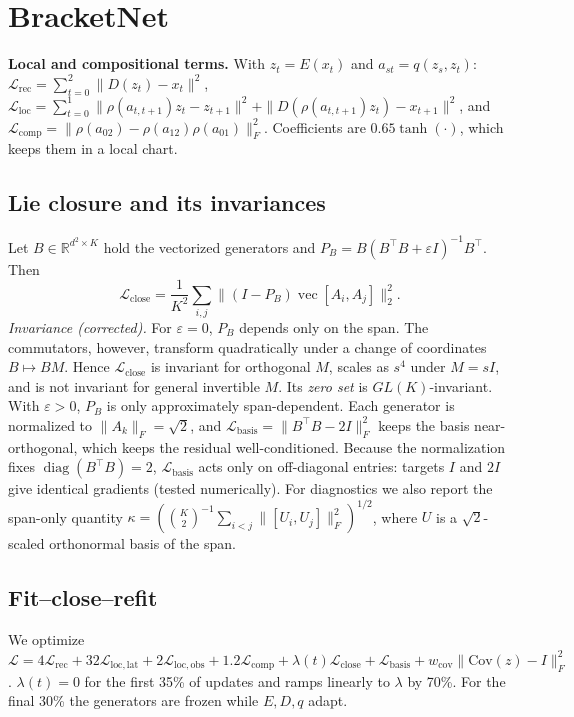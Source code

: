 \documentclass[10pt]{article}
\newcommand{\Lclose}{\mathcal{L}_{\mathrm{close}}}
\begin{document}
\section{BracketNet}
\textbf{Local and compositional terms.} With $z_t=E(x_t)$ and $a_{st}=q(z_s,z_t)$:
$\mathcal L_{\mathrm{rec}}=\sum_{t=0}^2\|D(z_t)-x_t\|^2$,
$\mathcal L_{\mathrm{loc}}=\sum_{t=0}^1\|\rho(a_{t,t+1})z_t-z_{t+1}\|^2+\|D(\rho(a_{t,t+1})z_t)-x_{t+1}\|^2$,
and $\mathcal L_{\mathrm{comp}}=\|\rho(a_{02})-\rho(a_{12})\rho(a_{01})\|_F^2$. Coefficients are
$0.65\tanh(\cdot)$, which keeps them in a local chart.

\subsection{Lie closure and its invariances}\label{sec:closure}
Let $B\in\mathbb R^{d^2\times K}$ hold the vectorized generators and $P_B=B(B^\top B+\varepsilon I)^{-1}B^\top$. Then
\begin{equation}\label{eq:lclose}
\Lclose=\frac1{K^2}\sum_{i,j}\|(I-P_B)\operatorname{vec}[A_i,A_j]\|_2^2 .
\end{equation}
\emph{Invariance (corrected).} For $\varepsilon=0$, $P_B$ depends only on the span. The commutators, however,
transform quadratically under a change of coordinates $B\mapsto BM$. Hence $\Lclose$ is invariant for orthogonal
$M$, scales as $s^4$ under $M=sI$, and is not invariant for general invertible $M$. Its \emph{zero set} is
$GL(K)$-invariant. With $\varepsilon>0$, $P_B$ is only approximately span-dependent. Each generator is normalized
to $\|A_k\|_F=\sqrt2$, and $\mathcal L_{\mathrm{basis}}=\|B^\top B-2I\|_F^2$ keeps the basis near-orthogonal, which
keeps the residual well-conditioned. Because the normalization fixes $\operatorname{diag}(B^\top B)=2$,
$\mathcal L_{\mathrm{basis}}$ acts only on off-diagonal entries: targets $I$ and $2I$ give identical gradients
(tested numerically). For diagnostics we also report the span-only quantity
$\kappa=(\binom K2^{-1}\sum_{i<j}\|[U_i,U_j]\|_F^2)^{1/2}$, where $U$ is a $\sqrt2$-scaled orthonormal basis of the
span.

\subsection{Fit--close--refit}
We optimize
$\mathcal L=4\mathcal L_{\mathrm{rec}}+32\mathcal L_{\mathrm{loc,lat}}+2\mathcal L_{\mathrm{loc,obs}}+1.2\mathcal L_{\mathrm{comp}}+\lambda(t)\Lclose+\mathcal L_{\mathrm{basis}}+w_{\mathrm{cov}}\|\mathrm{Cov}(z)-I\|_F^2$.
$\lambda(t)=0$ for the first 35\% of updates and ramps linearly to $\lambda$ by 70\%. For the final 30\% the
generators are frozen while $E,D,q$ adapt.
\end{document}
